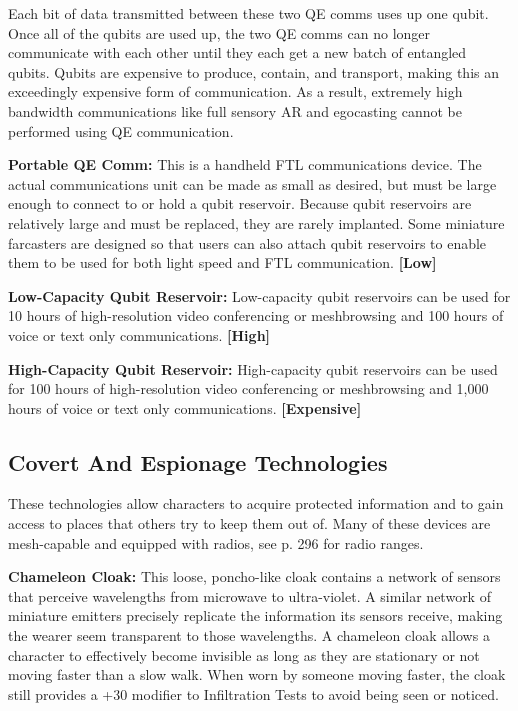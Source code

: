 Each bit of data transmitted between these two QE 
comms uses up one qubit. Once all of the qubits are 
used up, the two QE comms can no longer communicate
with each other until they each get a new batch
of entangled qubits. Qubits are expensive to produce, 
contain, and transport, making this an exceedingly 
expensive form of communication. As a result, extremely
high bandwidth communications like full
sensory AR and egocasting cannot be performed using 
QE communication.

\textbf{Portable QE Comm: }This is a handheld FTL communications
device. The actual communications unit
can be made as small as desired, but must be large 
enough to connect to or hold a qubit reservoir. Because
qubit reservoirs are relatively large and must be
replaced, they are rarely implanted. Some miniature 
farcasters are designed so that users can also attach 
qubit reservoirs to enable them to be used for both 
light speed and FTL communication. \textbf{[Low]}

\textbf{Low-Capacity Qubit Reservoir:} Low-capacity qubit 
reservoirs can be used for 10 hours of high-resolution 
video conferencing or meshbrowsing and 100 hours 
of voice or text only communications. \textbf{[High]}

\textbf{High-Capacity Qubit Reservoir:} High-capacity qubit 
reservoirs can be used for 100 hours of high-resolution 
video conferencing or meshbrowsing and 1,000 hours 
of voice or text only communications. \textbf{[Expensive]}

\subsection{Covert And Espionage Technologies}

These technologies allow characters to acquire protected
information and to gain access to places that
others try to keep them out of. Many of these devices 
are mesh-capable and equipped with radios, see p. 296 
for radio ranges.

\textbf{Chameleon Cloak: }This loose, poncho-like cloak 
contains a network of sensors that perceive wavelengths
from microwave to ultra-violet. A similar network
of miniature emitters precisely replicate the information
its sensors receive, making the wearer seem
transparent to those wavelengths. A chameleon cloak 
allows a character to effectively become invisible as 
long as they are stationary or not moving faster than 
a slow walk. When worn by someone moving faster, 
the cloak still provides a +30 modifier to Infiltration 
Tests to avoid being seen or noticed.

